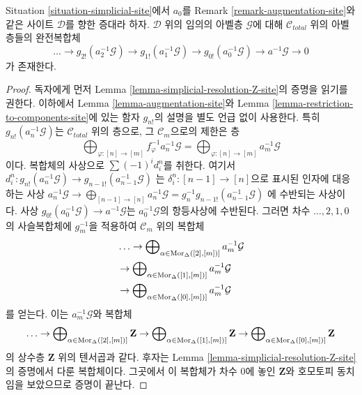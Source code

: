 \begin{lemma}
\label{lemma-simplicial-resolution-augmentation}
Situation \ref{situation-simplicial-site}에서 $a_0$를 Remark
\ref{remark-augmentation-site}와 같은 사이트 $\mathcal{D}$를 향한
증대라 하자. $\mathcal{D}$ 위의 임의의 아벨층 $\mathcal{G}$에 대해
$\mathcal{C}_{total}$ 위의 아벨층들의 완전복합체
$$
\ldots \to
g_{2!}(a_2^{-1}\mathcal{G}) \to
g_{1!}(a_1^{-1}\mathcal{G}) \to
g_{0!}(a_0^{-1}\mathcal{G}) \to
a^{-1}\mathcal{G} \to 0
$$
가 존재한다.
\end{lemma}

\begin{proof}
독자에게 먼저 Lemma \ref{lemma-simplicial-resolution-Z-site}의 증명을
읽기를 권한다. 이하에서 Lemma \ref{lemma-augmentation-site}와
Lemma \ref{lemma-restriction-to-components-site}에 있는 함자 $g_{n!}$의
설명을 별도 언급 없이 사용한다. 특히
$g_{n!}(a_n^{-1}\mathcal{G})$는 $\mathcal{C}_{total}$ 위의 층으로,
그 $\mathcal{C}_m$으로의 제한은 층
$$
\bigoplus\nolimits_{\varphi : [n] \to [m]} f_\varphi^{-1}a_n^{-1}\mathcal{G} =
\bigoplus\nolimits_{\varphi : [n] \to [m]} a_m^{-1}\mathcal{G}
$$
이다. 복합체의 사상으로 $\sum (-1)^i d^n_i$를 취한다. 여기서
$d^n_i : g_{n!}(a_n^{-1}\mathcal{G}) \to g_{n - 1!}(a_{n - 1}^{-1}\mathcal{G})$
는 $\delta^n_i : [n - 1] \to [n]$으로 표시된 인자에 대응하는 사상
$a_n^{-1}\mathcal{G} \to \bigoplus_{[n - 1] \to [n]} a_n^{-1}\mathcal{G} =
g_n^{-1}g_{n - 1!}(a_{n - 1}^{-1}\mathcal{G})$
에 수반되는 사상이다.
사상 $g_{0!}(a_0^{-1}\mathcal{G}) \to a^{-1}\mathcal{G}$는
$a_0^{-1}\mathcal{G}$의 항등사상에 수반된다.
그러면 차수 $\ldots, 2, 1, 0$의 사슬복합체에 $g_m^{-1}$을 적용하여
$\mathcal{C}_m$ 위의 복합체
$$
\begin{aligned}
&\ldots \to
\bigoplus\nolimits_{\alpha \in \mathop{\mathrm{Mor}}\nolimits_\Delta([2], [m])]} a_m^{-1}\mathcal{G}
\\
&\to
\bigoplus\nolimits_{\alpha \in \mathop{\mathrm{Mor}}\nolimits_\Delta([1], [m])]} a_m^{-1}\mathcal{G}
\\
&\to
\bigoplus\nolimits_{\alpha \in \mathop{\mathrm{Mor}}\nolimits_\Delta([0], [m])]} a_m^{-1}\mathcal{G}
\end{aligned}
$$
를 얻는다. 이는 $a_m^{-1}\mathcal{G}$와 복합체
$$
\ldots \to
\bigoplus\nolimits_{\alpha \in \mathop{\mathrm{Mor}}\nolimits_\Delta([2], [m])]} \mathbf{Z} \to
\bigoplus\nolimits_{\alpha \in \mathop{\mathrm{Mor}}\nolimits_\Delta([1], [m])]} \mathbf{Z} \to
\bigoplus\nolimits_{\alpha \in \mathop{\mathrm{Mor}}\nolimits_\Delta([0], [m])]} \mathbf{Z}
$$
의 상수층 $\mathbf{Z}$ 위의 텐서곱과 같다. 후자는
Lemma \ref{lemma-simplicial-resolution-Z-site}의 증명에서 다룬 복합체이다.
그곳에서 이 복합체가 차수 $0$에 놓인 $\mathbf{Z}$와 호모토피 동치임을
보았으므로 증명이 끝난다.
\end{proof}


